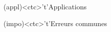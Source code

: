 \documentclass[../../main/main.tex]{subfiles}
\begin{document}
\begin{tcn}[%
		sidebyside, fontupper=\small, fontlower=\small
	]
	\begin{tcn}[nsp](appl)<ctc>'t'{Applications}
	\end{tcn}
	\begin{tcn}[nsp](impo)<ctc>'t'{Erreurs communes}
	\end{tcn}
\end{tcn}
\end{document}
